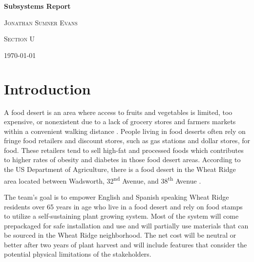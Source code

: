 \documentclass[12pt]{article}
\let\supscr=\textsuperscript
\begin{document}
\begin{titlepage}
    \centering
    \vspace{15cm}
    {\huge\bfseries Subsystems Report \par}
    \vspace{1cm}
    {\scshape\Large Jonathan Sumner Evans\par}
    \vfill
    {\scshape\large Section U\par}
    {\large \today\par}
    \vfill
\end{titlepage}

\section{Introduction}
A food desert is an area where access to fruits and vegetables is limited, too expensive, or
nonexistent due to a lack of grocery stores and farmers markets within a convenient walking
distance \cite{cdc-food-deserts}. People living in food deserts often rely on fringe food retailers
and discount stores, such as gas stations and dollar stores, for food. These retailers tend to sell
high-fat and processed foods which contributes to higher rates of obesity and diabetes in those food
desert areas. According to the US Department of Agriculture, there is a food desert in the Wheat
Ridge area located between Wadsworth, 32\supscr{nd} Avenue, and 38\supscr{th} Avenue
\cite{usda-food-deserts}.

The team’s goal is to empower English and Spanish speaking Wheat Ridge residents over 65 years in
age who live in a food desert and rely on food stamps to utilize a self-sustaining plant growing
system. Most of the system will come prepackaged for safe installation and use and will partially
use materials that can be sourced in the Wheat Ridge neighborhood. The net cost will be neutral or
better after two years of plant harvest and will include features that consider the potential
physical limitations of the stakeholders.
\end{document}
